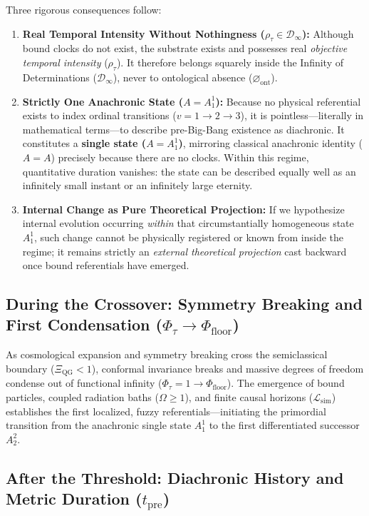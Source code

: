 \documentclass[11pt,a4paper]{article}
\begin{document}
Three rigorous consequences follow:
\begin{enumerate}[label=\textbf{\arabic*.}]
    \item \textbf{Real Temporal Intensity Without Nothingness ($\rho_\tau \in \mathcal{D}_\infty$):} Although bound clocks do not exist, the substrate exists and possesses real \emph{objective temporal intensity} ($\rho_\tau$). It therefore belongs squarely inside the Infinity of Determinations ($\mathcal{D}_\infty$), never to ontological absence ($\varnothing_{\mathrm{ont}}$).
    \item \textbf{Strictly One Anachronic State ($A = A_1^1$):} Because no physical referential exists to index ordinal transitions ($v = 1 \to 2 \to 3$), it is pointless—literally in mathematical terms—to describe pre-Big-Bang existence as diachronic. It constitutes a \textbf{single state ($A = A_1^1$)}, mirroring classical anachronic identity ($A = A$) precisely because there are no clocks. Within this regime, quantitative duration vanishes: the state can be described equally well as an infinitely small instant or an infinitely large eternity.
    \item \textbf{Internal Change as Pure Theoretical Projection:} If we hypothesize internal evolution occurring \emph{within} that circumstantially homogeneous state $A_1^1$, such change cannot be physically registered or known from inside the regime; it remains strictly an \emph{external theoretical projection} cast backward once bound referentials have emerged.
\end{enumerate}

\subsection{During the Crossover: Symmetry Breaking and First Condensation ($\Phi_\tau \to \Phi_{\mathrm{floor}}$)}

As cosmological expansion and symmetry breaking cross the semiclassical boundary ($\Xi_{\mathrm{QG}} < 1$), conformal invariance breaks and massive degrees of freedom condense out of functional infinity ($\Phi_\tau = 1 \to \Phi_{\mathrm{floor}}$). The emergence of bound particles, coupled radiation baths ($\Omega \ge 1$), and finite causal horizons ($\mathcal{L}_{\mathrm{sim}}$) establishes the first localized, fuzzy referentials—initiating the primordial transition from the anachronic single state $A_1^1$ to the first differentiated successor $A_2^2$.

\subsection{After the Threshold: Diachronic History and Metric Duration ($t_{\mathrm{pre}}$)}
\end{document}
